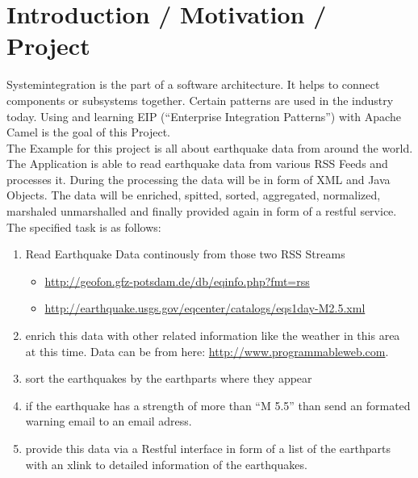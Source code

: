 \documentclass[11pt,english,ngerman, headsepline]{scrreprt}
\begin{document}


%
\tableofcontents{}

\pagestyle{scrheadings}    %



\chapter{Introduction / Motivation / Project}
 
Systemintegration is the part of a software architecture. It helps to connect components or
subsystems together. Certain patterns are used in the industry today. Using and learning
EIP (“Enterprise Integration Patterns”) with Apache Camel is the goal of this
Project. \\

The Example for this project is all about earthquake data from
around the world. The Application is able to read earthquake data from various RSS Feeds and processes it. During
the processing the data will be in form of XML and Java Objects. The data will be enriched,
spitted, sorted, aggregated, normalized, marshaled unmarshalled and finally provided again
in form of a restful service.\\
 
 The specified task is as follows:
 
 \begin{enumerate}
   
 
 \item Read Earthquake Data continously from those two RSS Streams
 \begin{itemize}
  	\item \url{http://geofon.gfz-potsdam.de/db/eqinfo.php?fmt=rss}
  	\item \url{http://earthquake.usgs.gov/eqcenter/catalogs/eqs1day-M2.5.xml}
  \end{itemize}
  \item enrich this data with other related information like the weather in this
  area at this time. Data can be from here: \url{http://www.programmableweb.com}.
  \item sort the earthquakes by the earthparts where they appear
  \item if the earthquake has a strength of more than ``M 5.5'' than send an
  formated warning email to an email adress.
  \item  provide this data via a Restful interface in form of a list of the
  earthparts with an xlink to detailed information of the earthquakes.
  
 \end{enumerate}
\end{document}
